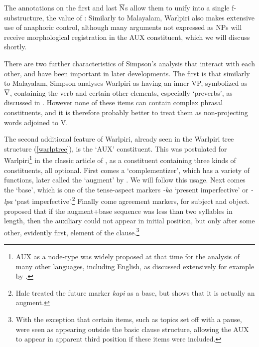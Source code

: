 \documentclass[output=paper,hidelinks]{langscibook}
\begin{document}
The annotations on the first and last $\overline{\hbox{N}}$s allow them to unify into a single
f-substructure, the value of {\SUBJ}: 
Similarly to Malayalam, Warlpiri also makes extensive use of anaphoric control, although
many arguments not expressed as NPs will receive morphological registration in the AUX
constituent, which we will discuss shortly.

There are two further characteristics of Simpson's analysis that interact with each
other, and have been important in later developments.
The first is that similarly to Malayalam, Simpson analyses Warlpiri
as having an inner VP, symbolized as $\overline{\hbox{V}}$, containing the verb and certain
other elements, especially `preverbs', as discussed in \citet[111]{Simpson1991}.
However none of these items can contain complex phrasal constituents, and it is
therefore probably better to treat them as non-projecting words adjoined to
V.

The second additional feature of Warlpiri, already seen in the Warlpiri tree structure
(\ref{warlptree}), is the `AUX' constituent.  This was postulated for Warlpiri\footnote
 {AUX as a node-type was widely proposed at that time for the analysis of
 many other languages, including English, as discussed extensively for
 example by \citet{AkmajianSteeleWasow1979}.}
in the classic article of
\citet[310]{Hale1973}, as a constituent containing three kinds of constituents,
all optional.  First comes a `complementizer', which has a variety of functions,
later called the `augment' by \citet{Laughren2002}.  We will follow this usage.
Next comes the `base', which is one of the tense-aspect markers {\it -ka}
`present imperfective' or {\it -lpa} `past imperfective'.\footnote
 {Hale treated the future marker {\it kapi} as a base, but \citet{Legate2008warl2p}
shows that it is actually an augment.}
Finally come agreement markers, for subject
and object.  \citet[312]{Hale1973} proposed  that if the augment+base sequence was less
than two syllables in length, then the auxiliary could
not appear in initial position, but only after some other, evidently first, element
of the clause.\footnote
 {With the exception that certain items, such as topics set off with a pause,
  were seen as appearing outside the basic clause structure, allowing the AUX
  to appear in apparent third position if these items were included.}
\end{document}
